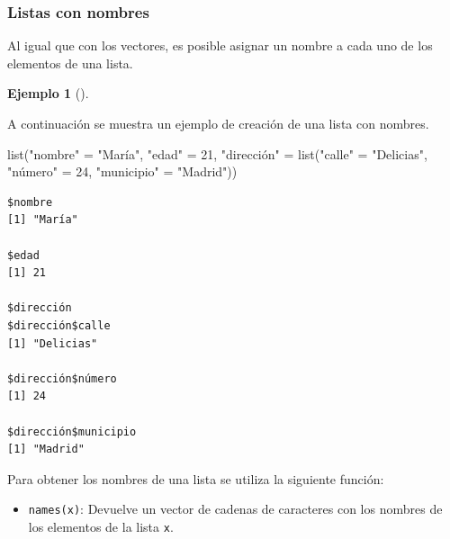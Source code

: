 \documentclass[
  a4paper,
]{scrreport}
\newenvironment{Shaded}{\begin{snugshade}}{\end{snugshade}}
\newcommand{\DecValTok}[1]{\textcolor[rgb]{0.68,0.00,0.00}{#1}}
\newcommand{\FunctionTok}[1]{\textcolor[rgb]{0.28,0.35,0.67}{#1}}
\newcommand{\NormalTok}[1]{\textcolor[rgb]{0.00,0.23,0.31}{#1}}
\newcommand{\OtherTok}[1]{\textcolor[rgb]{0.00,0.23,0.31}{#1}}
\newcommand{\StringTok}[1]{\textcolor[rgb]{0.13,0.47,0.30}{#1}}
\providecommand{\tightlist}{%
  \setlength{\itemsep}{0pt}\setlength{\parskip}{0pt}}\usepackage{longtable,booktabs,array}
\theoremstyle{definition}
\newtheorem{example}{Ejemplo}[chapter]
\theoremstyle{definition}
\theoremstyle{remark}
\begin{document}
\hypertarget{listas-con-nombres}{%
\subsubsection{Listas con nombres}\label{listas-con-nombres}}

Al igual que con los vectores, es posible asignar un nombre a cada uno
de los elementos de una lista.

\leavevmode{}%
\begin{example}[]\label{exm-creacion-listas-nombres}

A continuación se muestra un ejemplo de creación de una lista con
nombres.

\begin{Shaded}
\begin{Highlighting}[]
\FunctionTok{list}\NormalTok{(}\StringTok{"nombre"} \OtherTok{=} \StringTok{"María"}\NormalTok{, }\StringTok{"edad"} \OtherTok{=} \DecValTok{21}\NormalTok{, }\StringTok{"dirección"} \OtherTok{=} \FunctionTok{list}\NormalTok{(}\StringTok{"calle"} \OtherTok{=} \StringTok{"Delicias"}\NormalTok{, }\StringTok{"número"} \OtherTok{=} \DecValTok{24}\NormalTok{, }\StringTok{"municipio"} \OtherTok{=} \StringTok{"Madrid"}\NormalTok{))}
\end{Highlighting}
\end{Shaded}

\begin{verbatim}
$nombre
[1] "María"

$edad
[1] 21

$dirección
$dirección$calle
[1] "Delicias"

$dirección$número
[1] 24

$dirección$municipio
[1] "Madrid"
\end{verbatim}

\end{example}

Para obtener los nombres de una lista se utiliza la siguiente función:

\begin{itemize}
\tightlist
\item
  \texttt{names(x)}: Devuelve un vector de cadenas de caracteres con los
  nombres de los elementos de la lista \texttt{x}.
\end{itemize}
\end{document}
